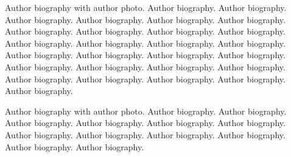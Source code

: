 \documentclass[a4paper,fleqn]{cas-dc}
\begin{document}
Author biography with author photo.
Author biography. Author biography. Author biography.
Author biography. Author biography. Author biography.
Author biography. Author biography. Author biography.
Author biography. Author biography. Author biography.
Author biography. Author biography. Author biography.
Author biography. Author biography. Author biography.
Author biography. Author biography. Author biography.
Author biography. Author biography. Author biography.
Author biography. Author biography. Author biography.
\endbio

Author biography with author photo.
Author biography. Author biography. Author biography.
Author biography. Author biography. Author biography.
Author biography. Author biography. Author biography.
Author biography. Author biography. Author biography.
\endbio
\end{document}
